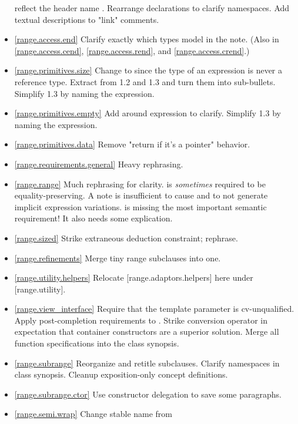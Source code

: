 \begin{itemize}
  reflect the header name .
  Rearrange declarations to clarify namespaces.
  Add textual descriptions to "link" comments.
\item \ref{range.access.end} Clarify exactly which types model 
  in the note. (Also in \ref{range.access.cend}, \ref{range.access.rend},
  and \ref{range.access.crend}.)
\item \ref{range.primitives.size} Change  to
   since the type of an expression is never a reference type.
  Extract  from 1.2 and 1.3 and turn them into
  sub-bullets. Simplify 1.3 by naming the expression.
\item \ref{range.primitives.empty} Add \tcode{()} around expression to clarify.
   Simplify 1.3 by naming the expression.
\item \ref{range.primitives.data}
  Remove "return  if it's a pointer" behavior.
\item \ref{range.requirements.general} Heavy rephrasing.
\item \ref{range.range} Much rephrasing for clarity.
   is \textit{sometimes} required to be equality-preserving.
  A note is insufficient to cause  and 
  to not generate implicit expression variations.
   is missing the most important
  semantic requirement! It also needs some explication.
\item \ref{range.sized} Strike extraneous deduction constraint; rephrase.
\item \ref{range.refinements} Merge tiny range subclauses into one.
\item \ref{range.utility.helpers} Relocate [range.adaptors.helpers] here
  under [range.utility].
\item \ref{range.view_interface} Require that the template parameter 
  is cv-unqualified. Apply post-completion requirements to .
  Strike conversion operator in expectation that container constructors are a
  superior solution.
  Merge all function specifications into the class synopsis.
\item \ref{range.subrange} Reorganize and retitle subclauses.
  Clarify namespaces in class synopsis.
  Cleanup exposition-only concept definitions.
\item \ref{range.subrange.ctor} Use constructor delegation to save some
  paragraphs.
\item \ref{range.semi.wrap} Change stable name from

\end{itemize}
